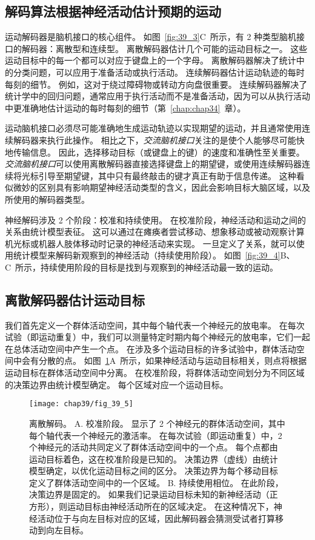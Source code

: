 \subsection{解码算法根据神经活动估计预期的运动}

运动解码器是脑机接口的核心组件。 
如图~\ref{fig:39_3}C~所示，有 2 种类型脑机接口的解码器：离散型和连续型。
离散解码器估计几个可能的运动目标之一。
这些运动目标中的每一个都可以对应于键盘上的一个字母。
离散解码器解决了统计中的分类问题，可以应用于准备活动或执行活动。
连续解码器估计运动轨迹的每时每刻的细节。
例如，这对于绕过障碍物或转动方向盘很重要。
连续解码器解决了统计学中的回归问题，通常应用于执行活动而不是准备活动，因为可以从执行活动中更准确地估计运动的每时每刻的细节（第~\ref{chap:chap34}~章）。


运动脑机接口必须尽可能准确地生成运动轨迹以实现期望的运动，并且通常使用连续解码器来执行此操作。
相比之下，\textit{交流脑机接口}关注的是使个人能够尽可能快地传输信息。
因此，选择移动目标（或键盘上的键）的速度和准确性至关重要。
\textit{交流脑机接口}可以使用离散解码器直接选择键盘上的期望键，或使用连续解码器连续将光标引导至期望键，其中只有最终敲击的键才真正有助于信息传递。
这种看似微妙的区别具有影响期望神经活动类型的含义，因此会影响目标大脑区域，以及所使用的解码器类型。


神经解码涉及 2 个阶段：校准和持续使用。
在校准阶段，神经活动和运动之间的关系由统计模型表征。
这可以通过在瘫痪者尝试移动、想象移动或被动观察计算机光标或机器人肢体移动时记录的神经活动来实现。
一旦定义了关系，就可以使用统计模型来解码新观察到的神经活动（持续使用阶段）。
如图~\ref{fig:39_4}B、C~所示，持续使用阶段的目标是找到与观察到的神经活动最一致的运动。



\subsection{离散解码器估计运动目标}

我们首先定义一个群体活动空间，其中每个轴代表一个神经元的放电率。
在每次试验（即运动重复）中，我们可以测量特定时期内每个神经元的放电率，它们一起在总体活动空间中产生一个点。
在涉及多个运动目标的许多试验中，群体活动空间中会有分散的点。
如图~\ref{fig:39_5}A~所示，如果神经活动与运动目标相关，则点将根据运动目标在群体活动空间中分离。
在校准阶段，将群体活动空间划分为不同区域的决策边界由统计模型确定。
每个区域对应一个运动目标。


\begin{figure}[htbp]
	\centering
	\texttt{[image: chap39/fig\_39\_5]}
	\caption{离散解码。
		A. 校准阶段。
		显示了 2 个神经元的群体活动空间，其中每个轴代表一个神经元的激活率。
		在每次试验（即运动重复）中，2 个神经元的活动共同定义了群体活动空间中的一个点。
		每个点都由运动目标着色，这在校准阶段是已知的。 
		决策边界（虚线）由统计模型确定，以优化运动目标之间的区分。
		决策边界为每个移动目标定义了群体活动空间中的一个区域。
		B. 持续使用相位。
		在此阶段，决策边界是固定的。
		如果我们记录运动目标未知的新神经活动（正方形），则运动目标由神经活动所在的区域决定。
		在这种情况下，神经活动位于与向左目标对应的区域，因此解码器会猜测受试者打算移动到向左目标。}
	\label{fig:39_5}
\end{figure}



